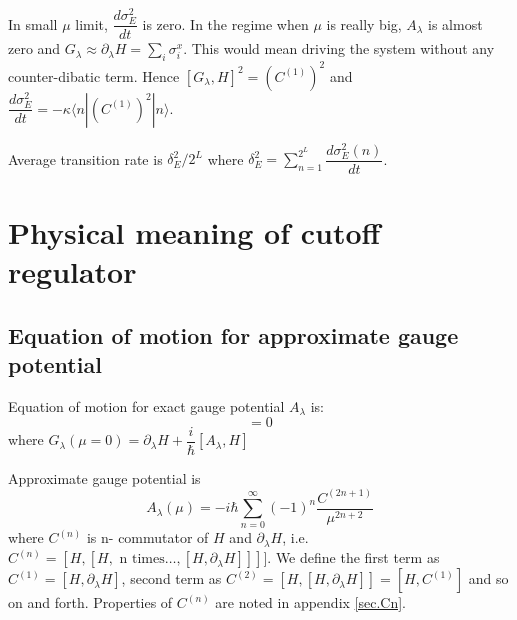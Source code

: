 \documentclass[11pt,a4paper]{article}
\begin{document}
In small $\mu$ limit,  $ \dfrac{d \sigma^2_E}{dt}$ is zero. In  the regime when $\mu$ is really big, $A_{\lambda}$ is almost zero and  $ G_{\lambda} \approx \partial_{\lambda} H = \sum_i \sigma_i^x$.  This would mean driving the system without any counter-dibatic term. Hence $[G_{\lambda}, H]^2= (C^{(1)}) ^2$ and $\dfrac{d \sigma^2_E}{dt}=-\kappa \langle n|(C^{(1)})^2 |n \rangle $.

Average transition rate is $\delta_E^2/2^L$ where $\delta_E^2= \sum_{n=1}^{2^L}\dfrac{d \sigma^2_E (n)}{dt}$.

\section{Physical meaning of cutoff regulator}
\subsection{Equation of motion for approximate gauge potential}
Equation of motion for exact gauge potential $A_{\lambda}$  is:
\begin{equation}
[H, G_{\lambda}(\mu=0)]=0
\end{equation}
where $G_{\lambda}(\mu=0)= \partial_{\lambda} H + \dfrac{i}{\hbar} [A_{\lambda}, H] $ 



Approximate gauge potential is 
\begin{equation}
 A_{\lambda}(\mu) =  -i\hbar \sum_{n=0}^{\infty}   (-1)^{n} \dfrac{ C^{(2n+1)}}{\mu^{2n+2}}
\end{equation}
where $C^{(n)}$ is n- commutator of $H$ and $\partial_{\lambda} H$, i.e. $C^{(n)}= [H, [H, \mbox{ n times} \ldots,[H, \partial_{\lambda} H ]]] ] $.  We define the first term as $C^{(1)}= [H, \partial_{\lambda}H]$, second term as $C^{(2)}= [H,[H, \partial_{\lambda}H]]= [H, C^{(1)}]$ and so on and forth. Properties of $C^{(n)}$ are noted in appendix \ref{sec.Cn}.
\end{document}
